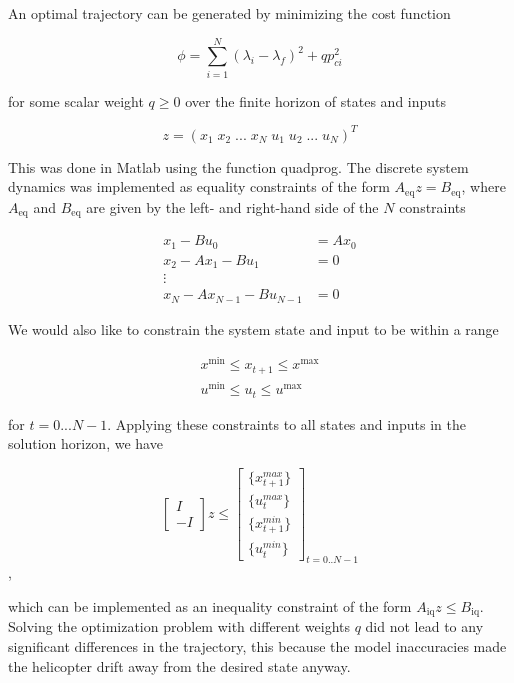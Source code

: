 An optimal trajectory can be generated by minimizing the cost function

\begin{equation}
	\label{eq:trajectory_cost}
	\phi = \sum_{i=1}^{N}(\lambda_i - \lambda_f)^2 + qp_{ci}^2
\end{equation}

for some scalar weight $q \geq 0$ over the finite horizon of states and inputs

\begin{equation}
	z = (x_1 \; x_2 \; ... \; x_N \; u_1 \; u_2 \; ... \; u_N)^T
\end{equation}

This was done in Matlab using the function quadprog. The discrete system dynamics was implemented as equality constraints of the form $A_{\text{eq}}z = B_{\text{eq}}$, where $A_{\text{eq}}$ and $B_{\text{eq}}$ are given by the left- and right-hand side of the $N$ constraints

\begin{align*}
	x_1 - Bu_0        &= Ax_0 \\
	x_2 - Ax_1 - Bu_1 &= 0    \\
	\vdots                    \\
	x_N - Ax_{N-1} - Bu_{N-1} &= 0
\end{align*}

We would also like to constrain the system state and input to be within a range

\begin{align}
	x^{\text{min}} \leq x_{t+1} \leq x^{\text{max}} \\
	u^{\text{min}} \leq u_t \leq u^{\text{max}}
\end{align}

for $t = 0...N-1$. Applying these constraints to all states and inputs in the solution horizon, we have

\begin{equation}
	\begin{bmatrix} I \\ -I \end{bmatrix} z
	\leq
	\begin{bmatrix}
	\{x_{t+1}^{max}\} \\
	\{u_t^{max}\} \\
	\{x_{t+1}^{min}\} \\
	\{u_t^{min}\}
	\end{bmatrix}_{t=0..N-1}
\end{equation},

which can be implemented as an inequality constraint of the form $A_{\text{iq}} z \leq B_{\text{iq}}$. Solving the optimization problem with different weights $q$ did not lead to any significant differences in the trajectory, this because the model inaccuracies made the helicopter drift away from the desired state anyway.

